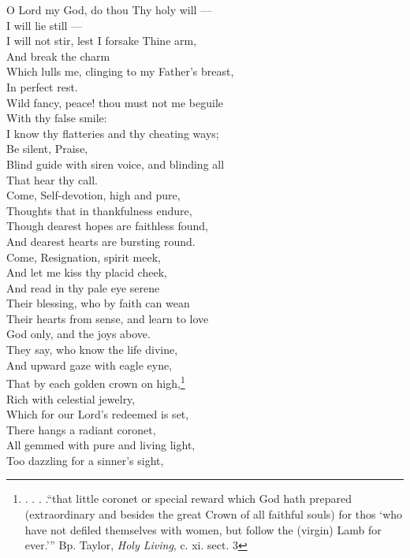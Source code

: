 O Lord my God, do thou Thy holy will — \\
 I will lie still — \\
 I will not stir, lest I forsake Thine arm, \\
 And break the charm \\
 Which lulls me, clinging to my Father’s breast, \\
 In perfect rest. \\
  Wild fancy, peace! thou must not me beguile \\
 With thy false smile: \\
 I know thy flatteries and thy cheating ways; \\
 Be silent, Praise, \\
 Blind guide with siren voice, and blinding all \\
 That hear thy call. \\
  Come, Self-devotion, high and pure, \\
 Thoughts that in thankfulness endure, \\
 Though dearest hopes are faithless found, \\
 And dearest hearts are bursting round. \\
 Come, Resignation, spirit meek, \\
 And let me kiss thy placid cheek, \\
 And read in thy pale eye serene \\
 Their blessing, who by faith can wean \\
 Their hearts from sense, and learn to love \\
 God only, and the joys above. \\
  They say, who know the life divine, \\
 And upward gaze with eagle eyne, \\
 That by each golden crown on high,\footnote{. . . .“that little coronet or special reward which God hath prepared (extraordinary and besides the great Crown of all faithful souls) for thos ‘who have not defiled themselves with women, but follow the (virgin) Lamb for ever.’” Bp. Taylor, \emph{Holy Living}, c. xi. sect. 3} \\
 Rich with celestial jewelry, \\
 Which for our Lord’s redeemed is set, \\
 There hangs a radiant coronet, \\
 All gemmed with pure and living light, \\
 Too dazzling for a sinner’s sight, \\
